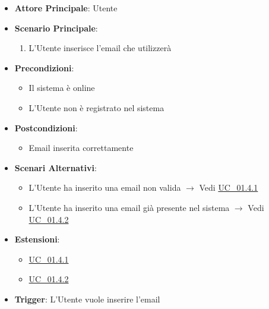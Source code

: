 \begin{itemize}
    \item \textbf{Attore Principale}: Utente
    \item \textbf{Scenario Principale}:
    \begin{enumerate}
        \item L'Utente inserisce l’email che utilizzerà
    \end{enumerate}
    \item \textbf{Precondizioni}:
    \begin{itemize}
        \item Il sistema è online
        \item L'Utente non è registrato nel sistema
    \end{itemize}
    \item \textbf{Postcondizioni}:
    \begin{itemize}
        \item Email inserita correttamente
    \end{itemize}
    \item \textbf{Scenari Alternativi}:
    \begin{itemize}
        \item L'Utente ha inserito una email non valida $\rightarrow$ Vedi \hyperref[uc_01.4.1]{UC\_01.4.1}
        \item L'Utente ha inserito una email già presente nel sistema $\rightarrow$ Vedi \hyperref[uc_01.4.2]{UC\_01.4.2}
    \end{itemize}
    \item \textbf{Estensioni}:
    \begin{itemize}
        \item \hyperref[uc_01.4.1]{UC\_01.4.1}
        \item \hyperref[uc_01.4.2]{UC\_01.4.2}
    \end{itemize}
    \item \textbf{Trigger}: L'Utente vuole inserire l'email
\end{itemize}

\label{uc_01.4.1}

